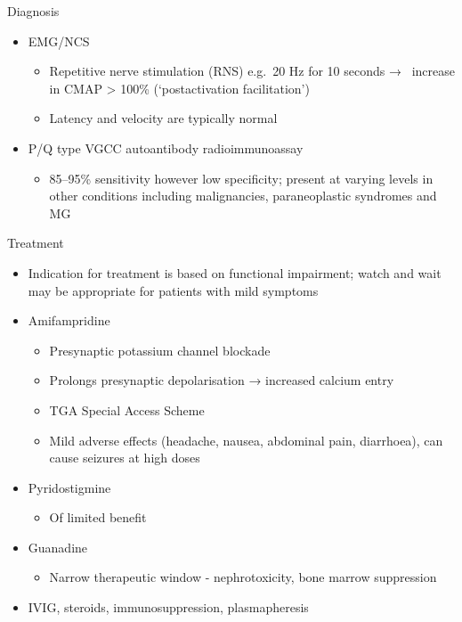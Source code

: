 \documentclass[
  ignorenonframetext,
]{beamer}
\providecommand{\tightlist}{%
  \setlength{\itemsep}{0pt}\setlength{\parskip}{0pt}}
\begin{document}
\begin{frame}{Diagnosis}
\protect\hypertarget{diagnosis}{}
\begin{itemize}
\tightlist
\item
  EMG/NCS

  \begin{itemize}
  \tightlist
  \item
    Repetitive nerve stimulation (RNS) e.g.~20 Hz for 10 seconds →
    ~increase in CMAP \textgreater{} 100\% (`postactivation
    facilitation')
  \item
    Latency and velocity are typically normal
  \end{itemize}
\item
  P/Q type VGCC autoantibody radioimmunoassay

  \begin{itemize}
  \tightlist
  \item
    85--95\% sensitivity however low specificity; present at varying
    levels in other conditions including malignancies, paraneoplastic
    syndromes and MG
  \end{itemize}
\end{itemize}
\end{frame}

\begin{frame}{Treatment}
\protect\hypertarget{treatment}{}
\begin{itemize}
\item
  Indication for treatment is based on functional impairment; watch and
  wait may be appropriate for patients with mild symptoms
\item
  Amifampridine

  \begin{itemize}
  \tightlist
  \item
    Presynaptic potassium channel blockade
  \item
    Prolongs presynaptic depolarisation → increased calcium entry
  \item
    TGA Special Access Scheme
  \item
    Mild adverse effects (headache, nausea, abdominal pain, diarrhoea),
    can cause seizures at high doses
  \end{itemize}
\item
  Pyridostigmine

  \begin{itemize}
  \tightlist
  \item
    Of limited benefit
  \end{itemize}
\item
  Guanadine

  \begin{itemize}
  \tightlist
  \item
    Narrow therapeutic window - nephrotoxicity, bone marrow suppression
  \end{itemize}
\item
  IVIG, steroids, immunosuppression, plasmapheresis
\end{itemize}
\end{frame}
\end{document}
